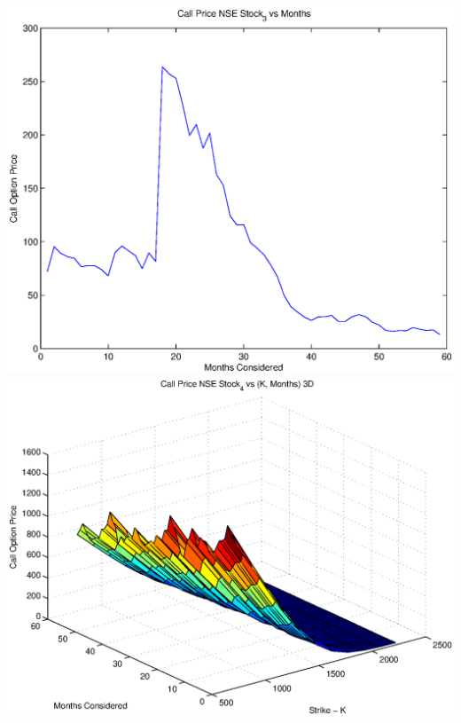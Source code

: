 \documentclass{article}
\begin{document}
\includegraphics[width=\textwidth]{Call_Price_NSE_Stock_3_vs_Months} \\

\includegraphics[width=\textwidth]{Call_Price_NSE_Stock_4_vs_(K,_Months)_3D} \\
\end{document}
